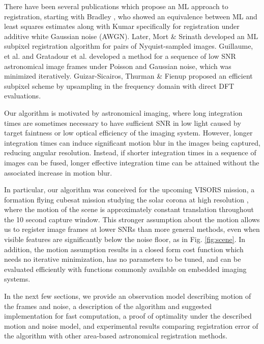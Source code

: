 \documentclass{article}
\begin{document}
There have been several publications which propose an ML approach to registration, starting with Bradley \cite{bradley1973equivalence}, who showed an equivalence between ML and least squares estimates along with Kumar \cite{kumar1992correlation} specifically for registration under additive white Gaussian noise (AWGN).  Later, Mort \& Srinath \cite{mort1988maximum} developed an ML subpixel registration algorithm for pairs of Nyquist-sampled images.  Guillaume, et al. \cite{guillaume1998maximum} and Gratadour et al. \cite{gratadour2005sub} developed a method for a sequence of low SNR astronomical image frames under Poisson and Gaussian noise, which was minimized iteratively.  Guizar-Sicairos, Thurman \& Fienup \cite{guizar2008efficient} proposed an efficient subpixel scheme by upsampling in the frequency domain with direct DFT evaluations.

Our algorithm is motivated by astronomical imaging, where long integration times are sometimes necessary to have sufficient SNR in low light caused by target faintness or low optical efficiency of the imaging system.  However, longer integration times can induce significant motion blur in the images being captured, reducing angular resolution.  Instead, if shorter integration times in a sequence of images can be fused, longer effective integration time can be attained without the associated increase in motion blur.

In particular, our algorithm was conceived for the upcoming VISORS mission, a formation flying cubesat mission studying the solar corona at high resolution \cite{gundamraj2021preliminary}, where the motion of the scene is approximately constant translation throughout the 10 second capture window.  This stronger assumption about the motion allows us to register image frames at lower SNRs than more general methods, even when visible features are significantly below the noise floor, as in Fig. \ref{fig:scene}.  In addition, the motion assumption results in a closed form cost function which needs no iterative minimization, has no parameters to be tuned, and can be evaluated efficiently with functions commonly available on embedded imaging systems.

In the next few sections, we provide an observation model describing motion of the frames and noise, a description of the algorithm and suggested implementation for fast computation, a proof of optimality under the described motion and noise model, and experimental results comparing registration error of the algorithm with other area-based astronomical registration methods.
\end{document}

